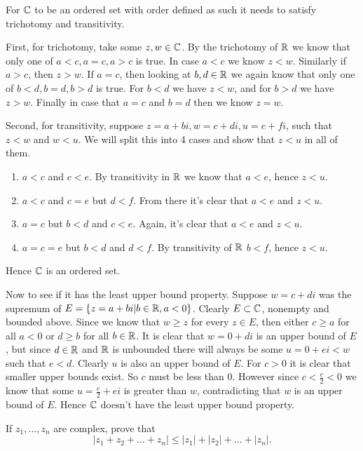 \begin{solution}
  For $\mathbb{C}$ to be an ordered set with order defined as such it needs to satisfy trichotomy and transitivity.

  First, for trichotomy, take some $z, w \in \mathbb{C}$.
  By the trichotomy of $\mathbb{R}$ we know that only one of $a < c, a = c, a > c$ is true.
  In case $a < c$ we know $z < w$.
  Similarly if $a > c$, then $z > w$.
  If $a = c$, then looking at $b, d \in \mathbb{R}$ we again know that only one of $b < d, b = d, b > d$ is true.
  For $b < d$ we have $z < w$, and for $b > d$ we have $z > w$.
  Finally in case that $a = c$ and $b = d$ then we know $z = w$.

  Second, for transitivity, suppose $z = a + bi, w = c + di, u = e + fi$, such that $z < w$ and $ w < u$.
  We will split this into 4 cases and show that $z < u$ in all of them.
  \begin{enumerate}[label=\textbf{Case \arabic*:}]
    \item $a < c$ and $c < e$. By transitivity in $\mathbb{R}$ we know that $a < e$, hence $z < u$.
    \item $a < c$ and $c = e$ but $d < f$. From there it's clear that $a < e$ and $z < u$.
    \item $a = c$ but $b < d$ and $c < e$. Again, it's clear that $a < e$ and $z < u$.
    \item $a = c = e$ but $b < d$ and $d < f$. By transitivity of $\mathbb{R}$ $b < f$, hence $z < u$.
  \end{enumerate}
  
  Hence $\mathbb{C}$ is an ordered set.

  Now to see if it has the least upper bound property.
  Suppose $w = c + di$ was the supremum of $E = \{z = a + bi | b \in \mathbb{R}, a < 0\}$.
  Clearly $E \subset \mathbb{C}$, nonempty and bounded above.
  Since we know that $w \ge z$ for every $z \in E$, then either $c \ge a$ for all $a < 0$ or $d \ge b$ for all $b \in \mathbb{R}$.
  It is clear that $w = 0 + di$ is an upper bound of $E$, but since $d \in \mathbb{R}$ and $\mathbb{R}$ is unbounded there will always be some $u = 0 + ei < w$ such that $e < d$.
  Clearly $u$ is also an upper bound of $E$.
  For $c > 0$ it is clear that smaller upper bounds exist.
  So $c$ must be less than $0$.
  However since $c < \frac{c}{2} < 0$ we know that some $u = \frac{c}{2} + ei$ is greater than $w$, contradicting that $w$ is an upper bound of $E$.
  Hence $\mathbb{C}$ doesn't have the least upper bound property.
\end{solution}

\setcounter{problem}{11}
\begin{problem}
  If $z_1, \ldots, z_n$ are complex, prove that \[|z_1 + z_2 + \ldots + z_n| \le |z_1| + |z_2| + \ldots + |z_n|.\]
\end{problem}

